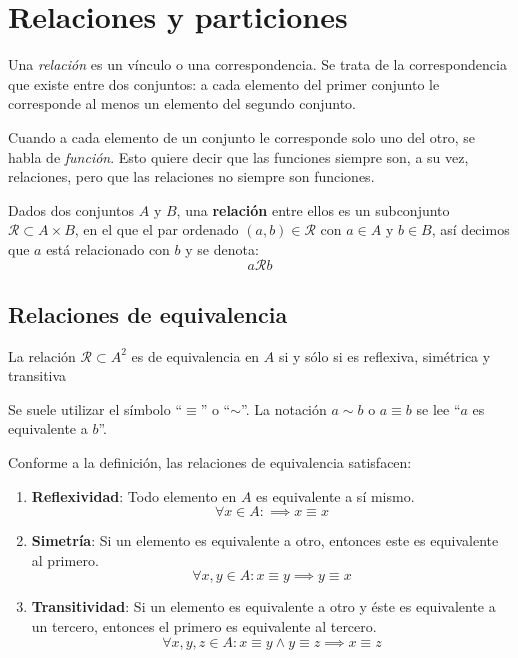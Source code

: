 \section{Relaciones y particiones}

	Una \textit{relación} es un vínculo o una correspondencia. Se trata de la correspondencia que existe entre dos conjuntos: a cada elemento del primer conjunto le corresponde al menos un elemento del segundo conjunto.
	
	Cuando a cada elemento de un conjunto le corresponde solo uno del otro, se habla de \textit{función}. Esto quiere decir que las funciones siempre son, a su vez, relaciones, pero que las relaciones no siempre son funciones.

\begin{fmd-definition}[Relaciones]
	Dados dos conjuntos $A$ y $B$, una \textbf{relación} entre ellos es un subconjunto $\mathcal{R} \subset A \times B$, en el que el par ordenado $(a, b) \in \mathcal{R}$ con $a \in A$ y $b \in B$, así decimos que $a$ está relacionado con $b$ y se denota:
	\[ a \mathcal{R} b \]
\end{fmd-definition}

\subsection{Relaciones de equivalencia}
\vspace{3mm}
\begin{fmd-definition}
	La relación $\mathcal{R} \subset A^2$ es de equivalencia en $A$ si y sólo si es reflexiva, simétrica y transitiva
\end{fmd-definition}

Se suele utilizar el símbolo ``$\equiv$'' o ``$\sim$''. La notación $a \sim b$ o $a \equiv b$ se lee ``$a$ es equivalente a $b$''.

Conforme a la definición, las relaciones de equivalencia satisfacen:

\begin{enumerate}[label=\roman*)]
	\item \textbf{Reflexividad}: Todo elemento en $A$ es equivalente a sí mismo.
	\[ \forall x \in A: \implies x \equiv x \]
	
	\item \textbf{Simetría}: Si un elemento es equivalente a otro, entonces este es equivalente al primero.
	\[ \forall x, y \in A: x \equiv y \implies y \equiv x \]
	
	\item \textbf{Transitividad}: Si un elemento es equivalente a otro y éste es equivalente a un tercero, entonces el primero es equivalente al tercero.
	\[ \forall x, y, z \in A: x \equiv y \land y \equiv z \implies x \equiv z \]
\end{enumerate}

